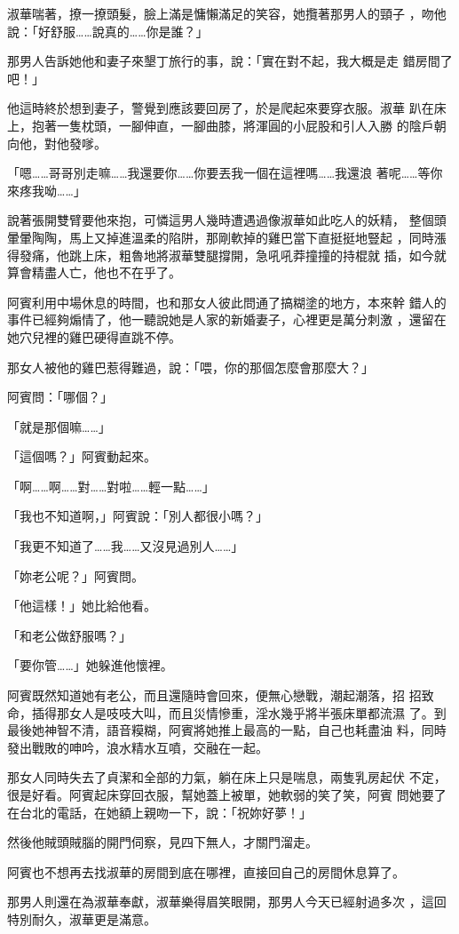 淑華喘著，撩一撩頭髮，臉上滿是慵懶滿足的笑容，她攬著那男人的頸子
，吻他說：「好舒服……說真的……你是誰？」

那男人告訴她他和妻子來墾丁旅行的事，說：「實在對不起，我大概是走
錯房間了吧！」

他這時終於想到妻子，警覺到應該要回房了，於是爬起來要穿衣服。淑華
趴在床上，抱著一隻枕頭，一腳伸直，一腳曲膝，將渾圓的小屁股和引人入勝
的陰戶朝向他，對他發嗲。

「嗯……哥哥別走嘛……我還要你……你要丟我一個在這裡嗎……我還浪
著呢……等你來疼我呦……」

說著張開雙臂要他來抱，可憐這男人幾時遭遇過像淑華如此吃人的妖精，
整個頭暈暈陶陶，馬上又掉進溫柔的陷阱，那剛軟掉的雞巴當下直挺挺地豎起
，同時漲得發痛，他跳上床，粗魯地將淑華雙腿撐開，急吼吼莽撞撞的持棍就
插，如今就算會精盡人亡，他也不在乎了。

阿賓利用中場休息的時間，也和那女人彼此問通了搞糊塗的地方，本來幹
錯人的事件已經夠煽情了，他一聽說她是人家的新婚妻子，心裡更是萬分刺激
，還留在她穴兒裡的雞巴硬得直跳不停。

那女人被他的雞巴惹得難過，說：「喂，你的那個怎麼會那麼大？」

阿賓問：「哪個？」

「就是那個嘛……」

「這個嗎？」阿賓動起來。

「啊……啊……對……對啦……輕一點……」

「我也不知道啊，」阿賓說：「別人都很小嗎？」

「我更不知道了……我……又沒見過別人……」

「妳老公呢？」阿賓問。

「他這樣！」她比給他看。

「和老公做舒服嗎？」

「要你管……」她躲進他懷裡。

阿賓既然知道她有老公，而且還隨時會回來，便無心戀戰，潮起潮落，招
招致命，插得那女人是吱吱大叫，而且災情慘重，淫水幾乎將半張床單都流濕
了。到最後她神智不清，語音糢糊，阿賓將她推上最高的一點，自己也耗盡油
料，同時發出戰敗的呻吟，浪水精水互噴，交融在一起。

那女人同時失去了貞潔和全部的力氣，躺在床上只是喘息，兩隻乳房起伏
不定，很是好看。阿賓起床穿回衣服，幫她蓋上被單，她軟弱的笑了笑，阿賓
問她要了在台北的電話，在她額上親吻一下，說：「祝妳好夢！」

然後他賊頭賊腦的開門伺察，見四下無人，才關門溜走。

阿賓也不想再去找淑華的房間到底在哪裡，直接回自己的房間休息算了。

那男人則還在為淑華奉獻，淑華樂得眉笑眼開，那男人今天已經射過多次
，這回特別耐久，淑華更是滿意。

